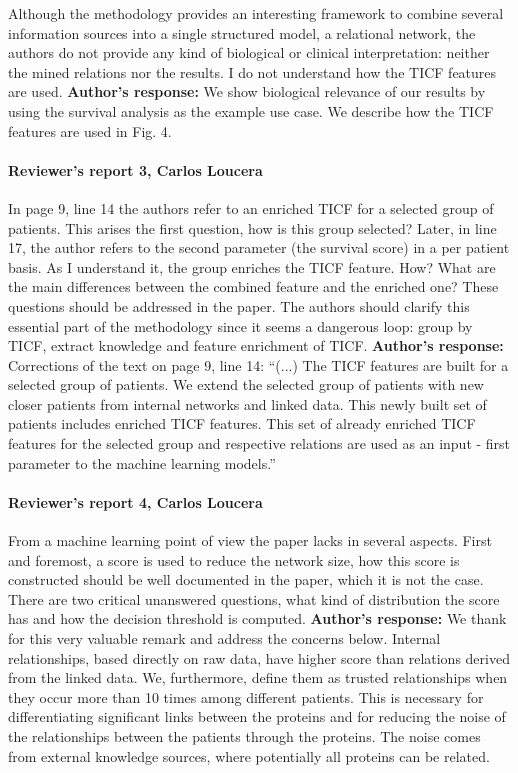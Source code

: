 \documentclass{bmcart}
\begin{document}
Although the methodology provides an interesting framework to combine several information sources into a single structured model, a relational network, the authors do not provide any kind of biological or clinical interpretation: neither the mined relations nor the results. I do not understand how the TICF features are used.
\newline \textbf{Author's response:}
We show biological relevance of our results by using the survival analysis as the example use case. 
We describe how the TICF features are used in Fig. 4.


\paragraph {Reviewer's report 3, Carlos Loucera}
In page 9, line 14 the authors refer to an enriched TICF for a selected group of patients. This arises the first question, how is this group selected? Later, in line 17, the author refers to the second parameter (the survival score) in a per patient basis. As I understand it, the group enriches the TICF feature. How? What are the main differences between the combined feature and the enriched one? These questions should be addressed in the paper. The authors should clarify this essential part of the methodology since it seems a dangerous loop: group by TICF, extract knowledge and feature enrichment of TICF. 
\newline \textbf{Author's response:}
Corrections of the text on page 9, line 14: “(...) The TICF features are built for a selected group of patients. We extend the selected group of patients with new closer patients from internal networks and linked data. This newly built set of patients includes enriched TICF features. This set of already enriched TICF features for the selected group and respective relations are used as an input - first parameter to the machine learning models.”


\paragraph {Reviewer's report 4, Carlos Loucera}
From a machine learning point of view the paper lacks in several aspects. First and foremost, a score is used to reduce the network size, how this score is constructed should be well documented in the paper, which it is not the case. There are two critical unanswered questions, what kind of distribution the score has and how the decision threshold is computed.
\newline \textbf{Author's response:}
We thank for this very valuable remark and address the concerns below.
Internal relationships, based directly on raw data, have higher score than relations derived from the linked data. We, furthermore, define them as trusted relationships when they occur more than 10 times among different patients. This is necessary for differentiating significant links between the proteins and for reducing the noise of the relationships between the patients through the proteins. The noise comes from external knowledge sources, where potentially all proteins can be related.
\end{document}
